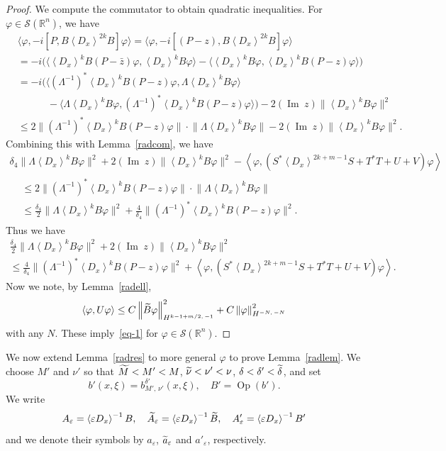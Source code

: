 \documentclass[10pt]{amsart}
\theoremstyle{definition}
\renewcommand*\d{\delta}
\newcommand*\e{\varepsilon}
\newcommand*\f{\varphi}
\newcommand*\n{\nu}
\newcommand*\x{\xi}
\renewcommand{\L}{\Lambda}
\DeclareMathOperator{\Op}{Op}
\newcommand*\re{\mathbb{R}}
\newcommand{\clS}{\mathcal{S}}
\DeclareMathOperator{\Iml}{Im\;}
\newcommand{\jap}[1]{\left\langle #1 \right\rangle}
\newcommand{\norm}[1]{\left\| #1 \right\|}
\newcommand{\bignorm}[1]{\bigl\| #1 \bigr\|}
\newcommand{\bigpare}[1]{\bigl(#1\bigr)}
\newcommand{\bigjap}[1]{\bigl\langle #1 \bigr\rangle}
\let\oldtilde\tilde
\renewcommand*{\tilde}[1]{\mathchoice{\widetilde{#1}}{\widetilde{#1}}{\oldtilde{#1}}{\oldtilde{#1}}}
\begin{document}
\begin{proof}
We compute the commutator to obtain quadratic inequalities. For $\f\in\clS(\re^n)$, we have
\begin{align*}
&\bigjap{\f,-i\left[P,B\jap{D_x}^{2k}B\right]\f} = \bigjap{\f,-i\left[(P-z),B\jap{D_x}^{2k}B\right]\f} \\
&= -i \bigpare{\bigjap{\jap{D_x}^k B(P-\bar z)\f,\jap{D_x}^k B\f} -\bigjap{\jap{D_x}^k B\f, \jap{D_x}^k B (P-z)\f}} \\
&= -i \bigpare{\bigjap{(\L^{-1})^*\jap{D_x}^k B(P-z)\f,\L\jap{D_x}^k B\f}\\
&\qquad\quad -\bigjap{\L\jap{D_x}^k B\f, (\L^{-1})^*\jap{D_x}^k B (P-z)\f}} -2(\Iml z)\bignorm{\jap{D_x}^k B\f}^2\\
&\leq 2\bignorm{(\L^{-1})^* \jap{D_x}^k B (P-z)\f}\cdot\bignorm{\L \jap{D_x}^k B\f} -2(\Iml z)\bignorm{\jap{D_x}^k B\f}^2.
\end{align*}
Combining this with Lemma~\ref{radcom}, we have
\begin{multline*}
\d_4\bignorm{\L\jap{D_x}^k B\f}^2 +2(\Iml z)\bignorm{\jap{D_x}^k B\f}^2
- \jap{\f,(S^*\jap{D_x}^{2k+m-1}S+T^*T+U+V)\f} \\
\begin{aligned}
&\leq 2\bignorm{(\L^{-1})^* \jap{D_x}^k B (P-z)\f}\cdot\bignorm{\L \jap{D_x}^k B\f}\\
&\leq \frac{\d_4}{2}\bignorm{\L \jap{D_x}^k B\f}^2 +\frac{4}{\d_4} \bignorm{(\L^{-1})^* \jap{D_x}^k B (P-z)\f}^2.
\end{aligned}
\end{multline*}
Thus we have
\begin{multline*}
\frac{\d_4}{2}\bignorm{\L \jap{D_x}^k B\f}^2 + 2(\Iml z)\bignorm{\jap{D_x}^k B\f}^2\\
\leq \frac{4}{\d_4} \bignorm{(\L^{-1})^* \jap{D_x}^k B (P-z)\f}^2
+\jap{\f,(S^*\jap{D_x}^{2k+m-1}S+T^*T+U+V)\f}.
\end{multline*}
Now we note, by Lemma~\ref{radell},
\[
\jap{\f,U\f} \leq C\norm{\tilde B\f}_{H^{k-1+m/2,\,-1}}^2 +C\norm{\f}_{H^{-N,\,-N}}^2
\]
with any $N$. These imply~\eqref{eq-1} for $\f\in\clS(\re^n)$.
\end{proof}

We now extend Lemma~\ref{radres} to more general $\f$ to prove Lemma~\ref{radlem}. We choose $M'$ and $\n'$ so that $\tilde M<M'<M$, $\tilde \n<\n'<\n$, $\d<\d'<\tilde\d$, and set
\[
b'(x,\x)=b^{\d'}_{M',\,\n'}(x,\x), \quad B'=\Op(b').
\]
We write
\[
A_\e= \jap{\e D_x}^{-1} B, \quad \tilde A_\e= \jap{\e D_x}^{-1} \tilde B, \quad A'_\e= \jap{\e D_x}^{-1} B'
\]
and we denote their symbols by $a_\e$, $\tilde a_\e$ and $a'_\e$, respectively.
\end{document}
